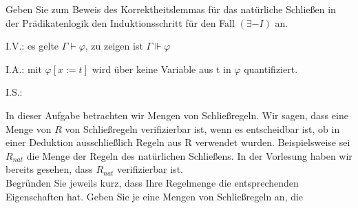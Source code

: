 \documentclass[10pt, a4paper]{exam}
\begin{document}
\begin{questions}
    \question Geben Sie zum Beweis des Korrektheitslemmas für das natürliche Schließen in der Prädikatenlogik den Induktionsschritt für den Fall $(\exists-I)$ an.
    \begin{solution}

        I.V.: es gelte $\Gamma\vdash\varphi$, zu zeigen ist $\Gamma\Vdash\varphi$

        I.A.: mit $\varphi[x:=t]$ wird über keine Variable aus t in $\varphi$ quantifiziert.

        I.S.:
    \end{solution}

    \question In dieser Aufgabe betrachten wir Mengen von Schließregeln. Wir sagen, dass eine Menge von $R$ von Schließregeln verifizierbar ist, wenn es entscheidbar ist, ob in einer Deduktion ausschließlich Regeln aus R verwendet wurden. Beispielsweise sei $R_{nat}$ die Menge der Regeln des natürlichen Schließens. In der Vorlesung haben wir bereits gesehen, dass $R_{nat}$ verifizierbar ist.\\
    Begründen Sie jeweils kurz, dass Ihre Regelmenge die entsprechenden Eigenschaften hat. Geben Sie je eine Mengen von Schließregeln an, die\\
\end{questions}
\end{document}
